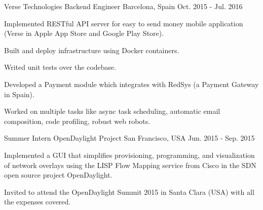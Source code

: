 
\begin{cventries}

\cventry
  {Verse Technologies}
  {Backend Engineer}
  {Barcelona, Spain}
  {Oct. 2015 - Jul. 2016}
  {
    \begin{cvitems} %
      \item{Implemented RESTful API server for easy to send money mobile application (Verse in Apple App Store and Google Play Store).}
      \item{Built and deploy infrastructure using Docker containers.}
      \item{Writed unit tests over the codebase.}
      \item{Developed a Payment module which integrates with RedSys (a Payment Gateway in Spain).}
      \item{Worked on multiple tasks like async task scheduling, automatic email composition, code profiling, robust web robots.}
    \end{cvitems}
  }

\cventry
	{Summer Intern}
	{OpenDaylight Project}
	{San Francisco, USA}
	{Jun. 2015 - Sep. 2015}
	{
    \begin{cvitems}
      \item{Implemented a GUI that simplifies provisioning, programming, and
		visualization of network overlays using the LISP Flow Mapping service from
  Cisco in the SDN open source project OpenDaylight.}
\item{Invited to attend the OpenDaylight Summit 2015 in Santa Clara (USA) with all the expenses covered.}
    \end{cvitems}
  }


\end{cventries}
